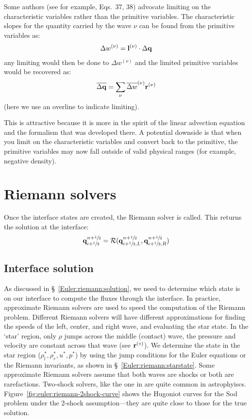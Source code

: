 Some authors (see for example, \cite{athena} Eqs.~37, 38) advocate
limiting on the characteristic variables rather than the primitive
variables.  The characteristic slopes for the quantity carried by the
wave $\nu$ can be found from the primitive variables
as: 
%
\begin{equation} 
\Delta w^{(\nu)} = {\bf l}^{(\nu)} \cdot \Delta {\bf q} 
\end{equation} 
%
any limiting would then be done to $\Delta w^{(\nu)}$ and the limited
primitive variables would be recovered as:
\begin{equation}
  \overline{\Delta {\bf q}} = \sum_\nu \overline{\Delta w}^{(\nu)}
  {\bf r}^{(\nu)} 
\end{equation} 
(here we use an overline to indicate limiting).

This is attractive because it is more in the spirit of the linear
advection equation and the formalism that was developed there.  A
potential downside is that when you limit on the characteristic
variables and convert back to the primitive, the primitive variables
may now fall outside of valid physical ranges (for example, negative
density).



\section{Riemann solvers}


Once the interface states are created, the Riemann solver is called.  This
returns the solution at the interface:
\begin{equation}
{\bf q}_{i+{\sfrac{1}{2}}}^{n+{\sfrac{1}{2}}} = \mathcal{R}({\bf q}_{i+{\sfrac{1}{2}},L}^{n+{\sfrac{1}{2}}}, {\bf q}_{i+{\sfrac{1}{2}},R}^{n+{\sfrac{1}{2}}})
\end{equation}

\subsection{Interface solution}

As discussed in \S~\ref{Euler:riemann:solution}, we need to determine
which state is on our interface to compute the fluxes through the
interface.  In practice, approximate Riemann solvers are used to speed
the computation of the Riemann problem.  Different Riemann solvers
will have different approximations for finding the speeds of the left,
center, and right wave, and evaluating the star state.  In the `star'
region, only $\rho$ jumps across the middle (contact) wave, the
pressure and velocity are constant across that wave (see ${\bf r}^{(\circ)}$).
We determine the state in the star region ($\rho_l^*, \rho_r^*, u^*,
p^*$) by using the jump conditions for the Euler equations or the
Riemann invariants, as shown in \S~\ref{Euler:riemann:starstate}.
Some approximate Riemann solvers assume that both waves are shocks or
both are rarefactions.  Two-shock solvers, like the one in
\cite{colellaglaz:1985} are quite common in astrophyiscs.
Figure~\ref{fig:euler:riemann-2shock-curve} shows the Hugoniot
curves for the Sod problem under the 2-shock assumption---they are
quite close to those for the true solution.

